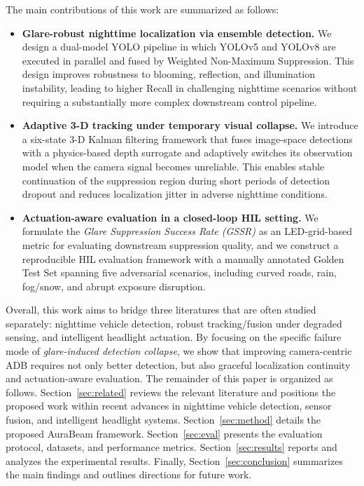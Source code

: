 \documentclass[pdflatex,sn-mathphys-num]{sn-jnl}%
\theoremstyle{thmstyleone}%
\theoremstyle{thmstyletwo}%
\theoremstyle{thmstylethree}%
\begin{document}
The main contributions of this work are summarized as follows:
\begin{itemize}
    \item \textbf{Glare-robust nighttime localization via ensemble detection.}
    We design a dual-model YOLO pipeline in which YOLOv5 and YOLOv8 are executed in parallel and fused by Weighted Non-Maximum Suppression. This design improves robustness to blooming, reflection, and
    illumination instability, leading to higher Recall in challenging nighttime scenarios without requiring a substantially more complex downstream control pipeline.

    \item \textbf{Adaptive 3-D tracking under temporary visual collapse.}
    We introduce a six-state 3-D Kalman filtering framework that fuses image-space detections with a physics-based depth surrogate and adaptively switches its observation model when the camera signal
    becomes unreliable. This enables stable continuation of the suppression region during short periods of detection dropout and reduces localization jitter in adverse nighttime conditions.

    \item \textbf{Actuation-aware evaluation in a closed-loop HIL setting.}
    We formulate the \emph{Glare Suppression Success Rate (GSSR)} as an LED-grid-based metric for evaluating downstream suppression quality, and we construct a reproducible HIL evaluation framework with a
    manually annotated Golden Test Set spanning five adversarial scenarios, including curved roads, rain, fog/snow, and abrupt
    exposure disruption.
\end{itemize}

Overall, this work aims to bridge three literatures that are often studied separately: nighttime vehicle detection, robust tracking/fusion under degraded sensing, and intelligent headlight actuation. By
focusing on the specific failure mode of \emph{glare-induced detection collapse}, we show that improving camera-centric ADB requires not only better detection, but also graceful localization continuity and actuation-aware evaluation.
The remainder of this paper is organized as follows.
Section~\ref{sec:related} reviews the relevant literature and positions the proposed work within recent advances in nighttime vehicle detection, sensor fusion, and intelligent headlight systems.
Section~\ref{sec:method} details the proposed AuraBeam framework.
Section~\ref{sec:eval} presents the evaluation protocol, datasets, and performance metrics.
Section~\ref{sec:results} reports and analyzes the experimental results.
Finally, Section~\ref{sec:conclusion} summarizes the main findings and
outlines directions for future work.
\end{document}
